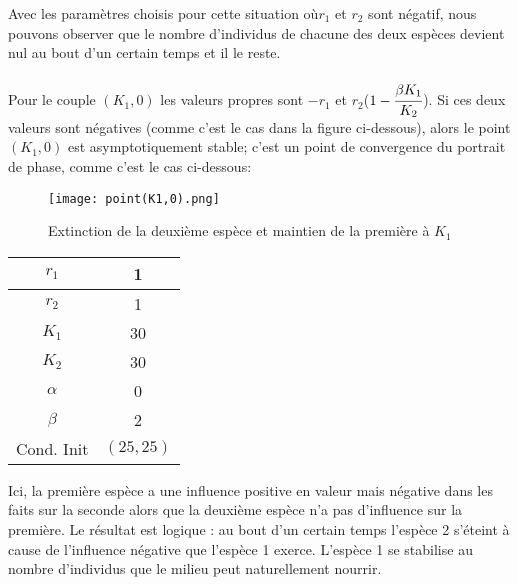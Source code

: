 \documentclass[11pt]{article}
\begin{document}
Avec les paramètres choisis pour cette situation où$r_1$ et $r_2$ sont négatif, nous pouvons observer que le nombre d'individus de chacune des deux espèces devient nul au bout d'un certain temps et il le reste.\\\\

Pour le couple $(K_1,0)$ les valeurs propres sont $-r_1$ et $r_2$($1-\cfrac{\beta K_1}{K_2}$). Si ces deux valeurs sont négatives (comme c'est le cas dans la figure ci-dessous), alors le point $(K_1,0)$ est asymptotiquement stable; c'est un point de convergence du portrait de phase, comme c'est le cas ci-dessous: \\
\begin{center}

\begin{figure}[H]
    \centering
    \texttt{[image: point(K1,0).png]}
    \caption{Extinction de la deuxième espèce et maintien de la première à $K_1$}
    \label{1}
\end{figure}
\begin{tabular}{c|c}
     $r_1$&1  \\
     \hline
     $r_2$&1 \\
     \hline
     $K_1$&30 \\
     \hline
     $K_2$&30\\
     \hline
     $\alpha$&0\\
     \hline
     $\beta$&2\\
     \hline
     Cond. Init& $(25,25)$
\end{tabular}
\end{center}

Ici, la première espèce a une influence positive en valeur mais négative dans les faits sur la seconde alors que la deuxième espèce n'a pas d'influence sur la première. Le résultat est logique : au bout d'un certain temps l'espèce 2 s'éteint à cause de l'influence négative que l'espèce 1 exerce. L'espèce 1 se stabilise au nombre d'individus que le milieu peut naturellement nourrir.\\
\end{document}
